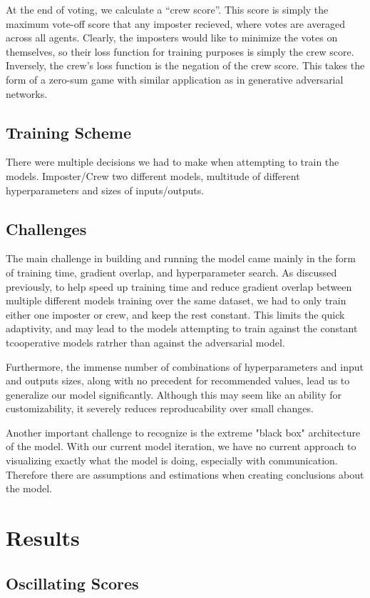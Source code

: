 \documentclass[10pt,twocolumn,letterpaper]{article}
\begin{document}
At the end of voting, we calculate a ``crew score''. This score is simply the
maximum vote-off score that any imposter recieved, where votes
are averaged across all agents. Clearly, the imposters would like to minimize the
votes on themselves, so their loss function for training purposes is
simply the crew score. Inversely, the crew's loss function is the negation of
the crew score. This takes the form of a zero-sum game with similar application
as in generative adversarial networks.
\subsection{Training Scheme}
There were multiple decisions we had to make when attempting to train the models.
Imposter/Crew two different models, multitude of different hyperparameters and
sizes of inputs/outputs.
\subsection{Challenges}
The main challenge in building and running the model
came mainly in the form of training time, gradient overlap, 
and hyperparameter search. As discussed previously, to help speed up training time
and reduce gradient overlap between multiple different models training over the
same dataset, we had to only train either one imposter or crew, and keep the rest constant.
This limits the quick adaptivity, and may lead to the models attempting to train
against the constant tcooperative models ratrher than against the adversarial model.

Furthermore, the immense number of combinations of hyperparameters
and input and outputs sizes, along with no precedent for recommended values,
lead us to generalize our model significantly. Although this may seem like an ability for
customizability, it severely reduces reproducability over small changes. 

Another important challenge to recognize is the extreme "black box" architecture
of the model. With our current model iteration, we have no current approach to visualizing
exactly what the model is doing, especially with communication. Therefore there are
assumptions and estimations when creating conclusions about the model.

\section{Results}
\subsection{Oscillating Scores}
\end{document}
